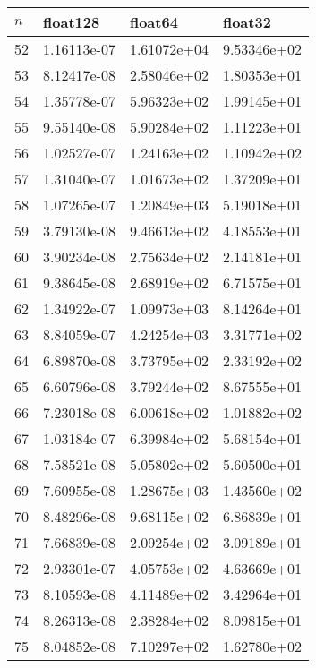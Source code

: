 \documentclass{article}
\begin{document}
\begin{table}[H]
{\begin{tabular}{|l|l|l|l|}
\end{tabular}
\hspace*{0cm}
}
\parbox{.45\linewidth}{
\hspace*{0cm}
\begin{tabular}{|l|l|l|l|}
\hline
$n$ & float128 & float64 & float32 \\ \hline
52 & 1.16113e-07 & 1.61072e+04 & 9.53346e+02 \\ \hline
53 & 8.12417e-08 & 2.58046e+02 & 1.80353e+01 \\ \hline
54 & 1.35778e-07 & 5.96323e+02 & 1.99145e+01 \\ \hline
55 & 9.55140e-08 & 5.90284e+02 & 1.11223e+01 \\ \hline
56 & 1.02527e-07 & 1.24163e+02 & 1.10942e+02 \\ \hline
57 & 1.31040e-07 & 1.01673e+02 & 1.37209e+01 \\ \hline
58 & 1.07265e-07 & 1.20849e+03 & 5.19018e+01 \\ \hline
59 & 3.79130e-08 & 9.46613e+02 & 4.18553e+01 \\ \hline
60 & 3.90234e-08 & 2.75634e+02 & 2.14181e+01 \\ \hline
61 & 9.38645e-08 & 2.68919e+02 & 6.71575e+01 \\ \hline
62 & 1.34922e-07 & 1.09973e+03 & 8.14264e+01 \\ \hline
63 & 8.84059e-07 & 4.24254e+03 & 3.31771e+02 \\ \hline
64 & 6.89870e-08 & 3.73795e+02 & 2.33192e+02 \\ \hline
65 & 6.60796e-08 & 3.79244e+02 & 8.67555e+01 \\ \hline
66 & 7.23018e-08 & 6.00618e+02 & 1.01882e+02 \\ \hline
67 & 1.03184e-07 & 6.39984e+02 & 5.68154e+01 \\ \hline
68 & 7.58521e-08 & 5.05802e+02 & 5.60500e+01 \\ \hline
69 & 7.60955e-08 & 1.28675e+03 & 1.43560e+02 \\ \hline
70 & 8.48296e-08 & 9.68115e+02 & 6.86839e+01 \\ \hline
71 & 7.66839e-08 & 2.09254e+02 & 3.09189e+01 \\ \hline
72 & 2.93301e-07 & 4.05753e+02 & 4.63669e+01 \\ \hline
73 & 8.10593e-08 & 4.11489e+02 & 3.42964e+01 \\ \hline
74 & 8.26313e-08 & 2.38284e+02 & 8.09815e+01 \\ \hline
75 & 8.04852e-08 & 7.10297e+02 & 1.62780e+02 \\ \hline

\end{tabular}}
\end{table}
\end{document}
